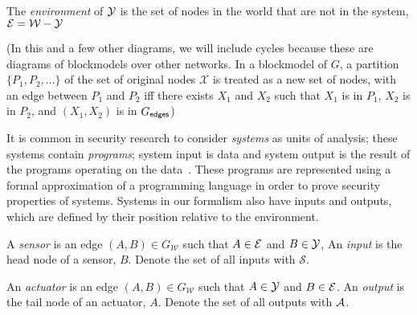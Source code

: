 \documentclass[../thesis.tex]{subfiles}
\newcommand{\W}{\mathcal{W}} %
\begin{document}

\begin{dfn}[Environment]
  The \emph{environment} of $\mathcal{Y}$ is the set of 
  nodes in the world that are not in the system,
  $\mathcal{E} = \W - \Y$ 
\end{dfn}

\begin{center}
\end{center}

(In this and a few other diagrams, we will include cycles because
these are diagrams of blockmodels over other networks.
In a blockmodel of $G$, a partition $\{P_1, P_2, \ldots\}$ of the set
of original nodes $\mathcal{X}$ is treated as a new set of nodes,
with an edge between $P_1$ and $P_2$ iff
there exists $X_1$ and $X_2$ such that $X_1$ is in $P_1$, $X_2$ is in $P_2$, and $(X_1,X_2)$ is in $G_{\mathsf{edges}}$)

It is common in security research to consider \emph{systems}
as units of analysis; these systems contain \emph{programs}; system
input is data and system output is the result of the programs
operating on the data~\cite{mclean90sp}.
These programs are represented using a formal approximation of a
programming language
in order to prove security properties of systems.
Systems in our formalism also have inputs and outputs,
which are defined by their position relative
to the environment.

\begin{dfn}
  A \emph{sensor} is an edge $(A,B) \in G_\W$
  such that $A \in \mathcal{E}$ and $B \in \mathcal{Y}$,
  An \emph{input} is the head node of a sensor, $B$.
  Denote the set of all inputs with $\mathcal{S}$.
\end{dfn}

%
%

\begin{dfn}
  An \emph{actuator} is an edge $(A,B) \in G_\W$ such
  that $A \in \mathcal{Y}$ and $B \in \mathcal{E}$.
  An \emph{output} is the tail node of an actuator, $A$.
  Denote the set of all outputs with $\mathcal{A}$.
\end{dfn}

\begin{center}
\end{center}
\end{document}
